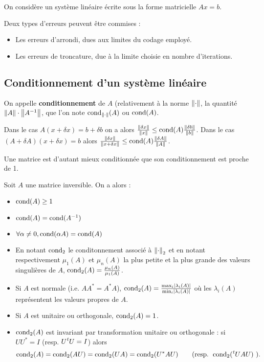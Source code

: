 On considère un système linéaire écrite sous la forme matricielle $Ax = b$.

Deux types d'erreurs peuvent être commises :
\begin{itemize}
\item[\textbullet] Les erreurs d'arrondi, dues aux limites du codage employé.
\item[\textbullet] Les erreurs de troncature, due à la limite choisie en nombre d'iterations.
\end{itemize}

\subsection{Conditionnement d'un système linéaire}

	\begin{defn}
		On appelle \textbf{conditionnement} de $A$ (relativement à la norme $\left\lVert\cdot\right\rVert$, la quantité $\left\lVert A\right\rVert \cdot \left\lVert A^{-1}\right\rVert$, que l'on note $\operatorname{cond}_{\left\lVert\cdot\right\rVert}(A)$ ou $\operatorname{cond}(A)$.
	\end{defn}

	Dans le cas $A(x + \delta x) = b + \delta b$ on a alors $\frac{\left\lVert\delta x\right\rVert}{\left\lVert x\right\rVert} \leq \operatorname{cond}(A) \frac{\left\lVert\delta b\right\rVert}{\left\lVert b\right\rVert}$.
	Dans le cas $(A + \delta A)(x + \delta x) = b$ alors $\frac{\left\lVert\delta x\right\rVert}{\left\lVert x + \delta x\right\rVert} \leq \operatorname{cond}(A) \frac{\left\lVert\delta A\right\rVert}{\left\lVert A\right\rVert}$.

	Une matrice est d'autant mieux conditionnée que son conditionnement est proche de 1.

	\begin{thm}
		Soit $A$ une matrice inversible. On a alors :
		\begin{itemize}
		\item[\textbullet] $\operatorname{cond}(A) \geq 1$
		\item[\textbullet] $\operatorname{cond}(A) = \operatorname{cond}(A^{-1})$
		\item[\textbullet] $\forall \alpha \neq 0, \operatorname{cond}(\alpha A) = \operatorname{cond}(A)$
		\item[\textbullet] En notant $\operatorname{cond}_2$ le conditonnement associé à $\left\lVert\cdot\right\rVert_2$ et en notant respectivement $\mu_1(A)$ et $\mu_n(A)$ la plus petite et la plus grande des valeurs singulières de $A$, $\operatorname{cond}_2(A) = \frac{\mu_n(A)}{\mu_1(A)}$.
		\item[\textbullet] Si $A$ est normale (i.e. $A A^* = A^* A$), $\operatorname{cond}_2(A) = \frac{\max_i \left\lvert\lambda_i(A)\right\rvert}{\min_i \left\lvert\lambda_i(A)\right\rvert}$ où les $\lambda_i(A)$ représentent les valeurs propres de $A$.
		\item[\textbullet] Si $A$ est unitaire ou orthogonale, $\operatorname{cond}_2(A) = 1$.
		\item[\textbullet]
			$\operatorname{cond}_2(A)$ est invariant par transformation unitaire ou orthogonale : si $U U^* = I$ (resp. $U \transp{U} = I$) alors
			$$\cond_2(A) = \cond_2(AU) = \cond_2(UA) = \cond_2(U^* A U) \qquad \text{(resp. } \cond_2(\transp{U}AU) \text{ )}.$$
		\end{itemize}
	\end{thm}

